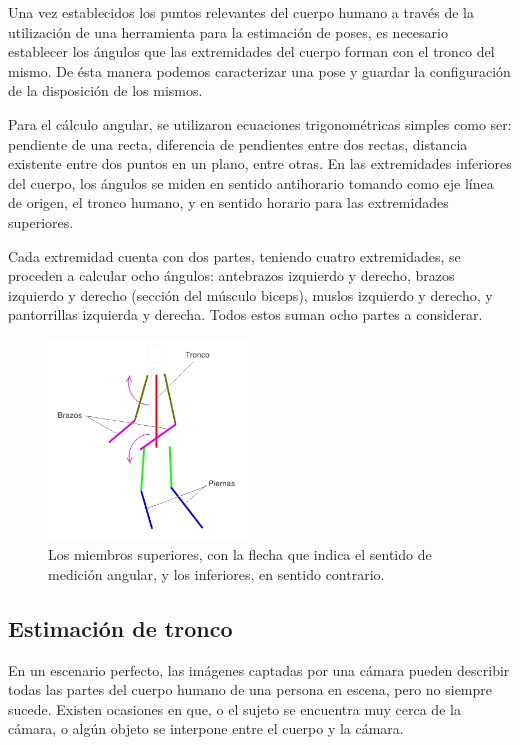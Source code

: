\documentclass[a4paper,12pt,oneside,spanish]{book}
\begin{document}
Una vez establecidos los puntos relevantes del cuerpo humano a través de la utilización de una herramienta para la estimación de poses, es necesario establecer los ángulos que las extremidades del cuerpo forman con el tronco del mismo. De ésta manera podemos caracterizar una pose y guardar la configuración de la disposición de los mismos.\par 

Para el cálculo angular, se utilizaron ecuaciones trigonométricas simples como ser: pendiente de una recta, diferencia de pendientes entre dos rectas, distancia existente entre dos puntos en un plano, entre otras. En las extremidades inferiores del cuerpo, los ángulos se miden en sentido antihorario tomando como eje línea de origen, el tronco humano, y en sentido horario para las extremidades superiores.\par

Cada extremidad cuenta con dos partes, teniendo cuatro extremidades, se proceden a calcular ocho ángulos: antebrazos izquierdo y derecho, brazos izquierdo y derecho (sección del músculo biceps), muslos izquierdo y derecho, y pantorrillas izquierda y derecha. Todos estos suman ocho partes a considerar.\par

\begin{figure}[h!]
	\includegraphics[width=150pt]{Imagenes/pose6.jpg}
	\centering	
	\caption{Los miembros superiores, con la flecha que indica el sentido de medición angular, y los inferiores, en sentido contrario.}
	\label{fig:pose5}
\end{figure}

\subsection{Estimación de tronco}
En un escenario perfecto, las imágenes captadas por una cámara pueden describir todas las partes del cuerpo humano de una persona en escena, pero no siempre sucede. Existen ocasiones en que, o el sujeto se encuentra muy cerca de la cámara, o algún objeto se interpone entre el cuerpo y la cámara.\par
\end{document}
